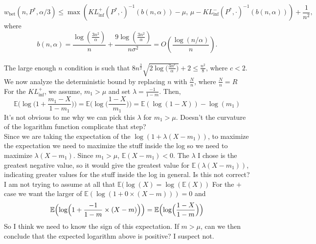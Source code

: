 \documentclass{article}
\newcommand{\art}[1]{\begingroup\color{blue}#1\endgroup}
\newcommand{\aadit}[1]{\begingroup\color{orange}#1\endgroup}
\renewcommand{\leq}{\leqslant}
\newcommand{\e}{\mathbb{E}}
\begin{document}
\begin{equation}
w_{\text{bet}}(n, P^*, \alpha/3) \leq \max \left( KL^+_{\text{inf}}(P^*, \cdot)^{-1}(b(n, \alpha)) - \mu, \, \mu - KL^-_{\text{inf}}(P^*, \cdot)^{-1}(b(n, \alpha)) \right) + \frac{1}{n^2},
\end{equation}
where 
\[
b(n, \alpha) = \frac{\log\left(\frac{3n^2}{\alpha}\right)}{n} + \frac{9 \log\left(\frac{3n^2}{\alpha}\right)}{n \sigma^2} = O\left( \frac{\log(n/\alpha)}{n} \right).
\]\\

The large enough $n$ condition is such that $8n^{\frac{3}{2}}\sqrt{2\log\Big(\frac{3n^c}{\alpha}\Big)} + 2 \leq \frac{n^2}{8}$, where $c < 2$. \\

\noindent We now analyze the deterministic bound by replacing $n$ with $\frac{N}{n}$, where $\frac{N}{n} = R$ \\


\setcounter{equation}{0}
For the $KL^+_{\text{inf}}$, we assume, $m_1 > \mu$ and set $\lambda = \frac{-1}{1-m}$.
Then,
\begin{equation}
    \mathbb{E}\Big(\log\Big(1 + \frac{m_1 - X}{1-m_1}\Big)\Big) = \mathbb{E}\Big(\log\Big(\frac{1 - X}{m_1}\Big)\Big) = \mathbb{E}(\log(1 - X)) - \log(m_1)
\end{equation}
\art{It's not obvious to me why we can pick this $\lambda$ for $m_1>\mu$. Doesn't the curvature of the logarithm function complicate that step?}\\
\aadit{Since we are taking the expectation of the $\log(1 + \lambda(X - m_1))$, to maximize the expectation we need to maximize the stuff inside the log so we need to maximize $\lambda(X - m_1)$. Since $m_1 > \mu$, $\mathbb{E}(X - m_1) < 0$. The $\lambda$ I chose is the greatest negative value, so it would give the greatest value for $\mathbb{E}(\lambda(X - m_1))$, indicating greater values for the stuff inside the log in general. Is this not correct? I am not trying to assume at all that $\mathbb{E}(\log(X) = \log(\mathbb{E}(X))$} \art{For the $+$ case we want the larger of $\e(\log(1+0\times(X-m)))=0$ and 
$$\e\Bigl(\log\Bigl(1+\frac{-1}{1-m}\times(X-m)\Bigr)\Bigr) =\e\Bigl(\log\Bigl( \frac{1-X}{1-m}\Bigr)\Bigr)$$
So I think we need to know the sign of this expectation. If $m>\mu$, can we then conclude that the expected logarithm above is positive? I suspect not.}\\
\end{document}
